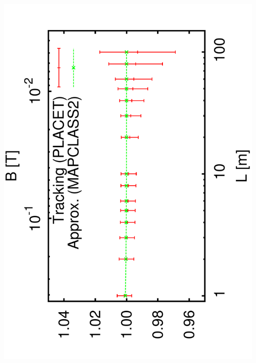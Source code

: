 \documentclass{beamer}
\begin{document}
\begin{frame}
 \includegraphics[scale=0.24,angle=-90]{sigma_Lbend_r6.pdf}\par

\end{frame}
\end{document}
